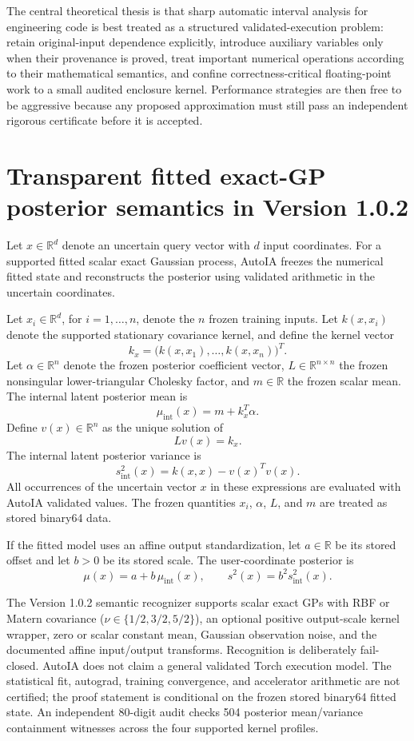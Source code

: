 \documentclass[11pt]{article}
\begin{document}
The central theoretical thesis is that sharp automatic interval analysis for
engineering code is best treated as a structured validated-execution problem:
retain original-input dependence explicitly, introduce auxiliary variables only
when their provenance is proved, treat important numerical operations according
to their mathematical semantics, and confine correctness-critical floating-point
work to a small audited enclosure kernel.  Performance strategies are then free
to be aggressive because any proposed approximation must still pass an independent
rigorous certificate before it is accepted.


\section{Transparent fitted exact-GP posterior semantics in Version 1.0.2}

Let $x\in\mathbb{R}^d$ denote an uncertain query vector with $d$ input
coordinates.  For a supported fitted scalar exact Gaussian process, AutoIA
freezes the numerical fitted state and reconstructs the posterior using validated
arithmetic in the uncertain coordinates.

Let $x_i\in\mathbb{R}^d$, for $i=1,\ldots,n$, denote the $n$ frozen training
inputs.  Let $k(x,x_i)$ denote the supported stationary covariance kernel, and
define the kernel vector
\[
k_x = \bigl(k(x,x_1),\ldots,k(x,x_n)\bigr)^T.
\]
Let $\alpha\in\mathbb{R}^n$ denote the frozen posterior coefficient vector,
$L\in\mathbb{R}^{n\times n}$ the frozen nonsingular lower-triangular Cholesky
factor, and $m\in\mathbb{R}$ the frozen scalar mean.  The internal latent
posterior mean is
\[
\mu_{\mathrm{int}}(x)=m+k_x^T\alpha.
\]
Define $v(x)\in\mathbb{R}^n$ as the unique solution of
\[
L v(x)=k_x.
\]
The internal latent posterior variance is
\[
s^2_{\mathrm{int}}(x)=k(x,x)-v(x)^T v(x).
\]
All occurrences of the uncertain vector $x$ in these expressions are evaluated
with AutoIA validated values.  The frozen quantities $x_i$, $\alpha$, $L$, and
$m$ are treated as stored binary64 data.

If the fitted model uses an affine output standardization, let $a\in\mathbb{R}$
be its stored offset and let $b>0$ be its stored scale.  The user-coordinate
posterior is
\[
\mu(x)=a+b\,\mu_{\mathrm{int}}(x),\qquad
s^2(x)=b^2 s^2_{\mathrm{int}}(x).
\]

The Version 1.0.2 semantic recognizer supports scalar exact GPs with RBF or
Matern covariance ($\nu\in\{1/2,3/2,5/2\}$), an optional positive output-scale
kernel wrapper, zero or scalar constant mean, Gaussian observation noise, and
the documented affine input/output transforms.  Recognition is deliberately
fail-closed.  AutoIA does not claim a general validated Torch execution model.
The statistical fit, autograd, training convergence, and accelerator arithmetic
are not certified; the proof statement is conditional on the frozen stored
binary64 fitted state.  An independent 80-digit audit checks 504 posterior
mean/variance containment witnesses across the four supported kernel profiles.
\end{document}
